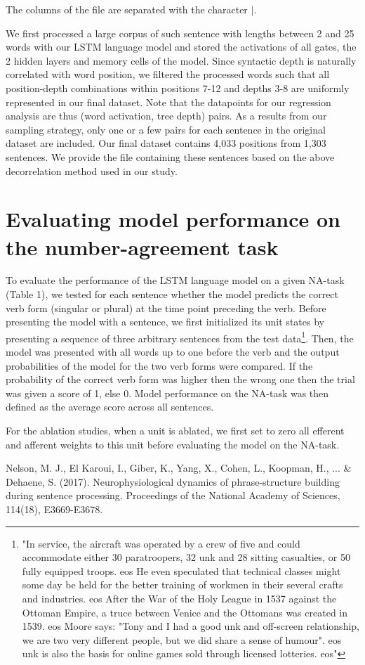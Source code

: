\documentclass{article}
\begin{document}
\noindent The columns of the file are separated with the character $|$.

We first processed a large corpus of such sentence with lengths between 2 and 25 words with our LSTM language model and stored the activations of all gates, the 2 hidden layers and memory cells of the model. Since syntactic depth is naturally correlated with word position, we filtered the processed words such that all position-depth combinations within positions 7-12 and depths 3-8 are uniformly represented in our final dataset. Note that the datapoints for our regression analysis are thus (word activation, tree depth) pairs. As a results from our sampling strategy, only one or a few pairs for each sentence in the original dataset are included. Our final dataset contains 4,033 positions from 1,303 sentences. We provide the file containing these sentences based on the above decorrelation method used in our study.



\section{Evaluating model performance on the number-agreement task}
To evaluate the performance of the LSTM language model on a given NA-task (Table 1), we tested for each sentence whether the model predicts the correct verb form (singular or plural) at the time point preceding the verb. Before presenting the model with a sentence, we first initialized its unit states by presenting a sequence of three arbitrary sentences from the test data\footnote{"In service, the aircraft was operated by a crew of five and could accommodate either 30 paratroopers, 32 unk and 28 sitting casualties, or 50 fully equipped troops. eos He even speculated that technical classes might some day be held for the better training of workmen in their several crafts and industries. eos After the War of the Holy League in 1537 against the Ottoman Empire, a truce between Venice and the Ottomans was created in 1539. eos Moore says: "Tony and I had a good unk and off-screen relationship, we are two very different people, but we did share a sense of humour". eos unk is also the basis for online games sold through licensed lotteries. eos"}. Then, the model was presented with all words up to one before the verb and the output probabilities of the model for the two verb forms were compared. If the probability of the correct verb form was higher then the wrong one then the trial was given a score of 1, else 0. Model performance on the NA-task was then defined as the average score across all sentences. 

For the ablation studies, when a unit is ablated, we first set to zero all efferent and afferent weights to this unit before evaluating the model on the NA-task.



\bigbreak

\noindent Nelson, M. J., El Karoui, I., Giber, K., Yang, X., Cohen, L., Koopman, H., ... \& Dehaene, S. (2017). Neurophysiological dynamics of phrase-structure building during sentence processing. Proceedings of the National Academy of Sciences, 114(18), E3669-E3678.
\end{document}
